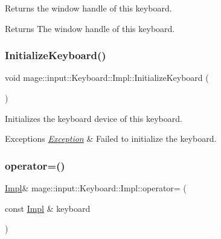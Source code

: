Returns the window handle of this keyboard.

\begin{DoxyReturn}{Returns}
The window handle of this keyboard. 
\end{DoxyReturn}
\hypertarget{classmage_1_1input_1_1_keyboard_1_1_impl_ae4854db552c4651503ec30bb6a477cae}{}\label{classmage_1_1input_1_1_keyboard_1_1_impl_ae4854db552c4651503ec30bb6a477cae} 
\subsubsection{\texorpdfstring{Initialize\+Keyboard()}{InitializeKeyboard()}}
{\footnotesize\ttfamily void mage\+::input\+::\+Keyboard\+::\+Impl\+::\+Initialize\+Keyboard (\begin{DoxyParamCaption}{ }\end{DoxyParamCaption})\hspace{0.3cm}{\ttfamily [private]}}

Initializes the keyboard device of this keyboard.


\begin{DoxyExceptions}{Exceptions}
{\em \hyperlink{classmage_1_1_exception}{Exception}} & Failed to initialize the keyboard. \\
\hline
\end{DoxyExceptions}
\hypertarget{classmage_1_1input_1_1_keyboard_1_1_impl_adf6d3d47c39fbef1ee288aeeda5c55a0}{}\label{classmage_1_1input_1_1_keyboard_1_1_impl_adf6d3d47c39fbef1ee288aeeda5c55a0} 
\subsubsection{\texorpdfstring{operator=()}{operator=()}\hspace{0.1cm}{\footnotesize\ttfamily [1/2]}}
{\footnotesize\ttfamily \hyperlink{classmage_1_1input_1_1_keyboard_1_1_impl}{Impl}\& mage\+::input\+::\+Keyboard\+::\+Impl\+::operator= (\begin{DoxyParamCaption}\item[{const \hyperlink{classmage_1_1input_1_1_keyboard_1_1_impl}{Impl} \&}]{keyboard }\end{DoxyParamCaption})\hspace{0.3cm}{\ttfamily [delete]}}

